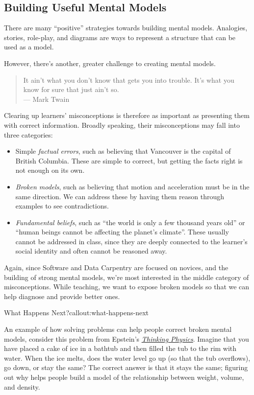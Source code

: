 \subsection{Building Useful Mental
Models}\label{building-useful-mental-models}

There are many ``positive'' strategies towards building mental models.
Analogies, stories, role-play, and diagrams are ways to represent a
structure that can be used as a model.

However, there's another, greater challenge to creating mental models.

\begin{quote}
It ain't what you don't know that gets you into trouble. It's what you
know for sure that just ain't so.\\--- Mark Twain
\end{quote}

Clearing up learners' misconceptions is therefore as important as
presenting them with correct information. Broadly speaking, their
misconceptions may fall into three categories:

\begin{itemize}
\item
  Simple \emph{factual errors}, such as believing that Vancouver is the
  capital of British Columbia. These are simple to correct, but getting
  the facts right is not enough on its own.
\item
  \emph{Broken models}, such as believing that motion and acceleration
  must be in the same direction. We can address these by having them
  reason through examples to see contradictions.
\item
  \emph{Fundamental beliefs}, such as ``the world is only a few thousand
  years old'' or ``human beings cannot be affecting the planet's
  climate''. These usually cannot be addressed in class, since they are
  deeply connected to the learner's social identity and often cannot be
  reasoned away.
\end{itemize}

Again, since Software and Data Carpentry are focused on novices, and the
building of strong mental models, we're most interested in the middle
category of misconceptions. While teaching, we want to expose broken
models so that we can help diagnose and provide better ones.

\begin{callout}{What Happens Next?}{callout:what-happens-next}

An example of how solving problems can help people correct broken mental
models, consider this problem from Epstein's
\emph{\href{http://www.amazon.com/Thinking-Physics-Understandable-Practical-Reality/dp/0935218084/r}{Thinking
Physics}}. Imagine that you have placed a cake of ice in a bathtub and
then filled the tub to the rim with water. When the ice melts, does the
water level go up (so that the tub overflows), go down, or stay the
same? The correct answer is that it stays the same; figuring out why
helps people build a model of the relationship between weight, volume,
and density.
\end{callout}

